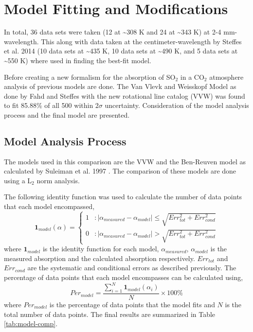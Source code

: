\chapter{Model Fitting and Modifications}
In total, 36 data sets were taken (12 at \textasciitilde 308 K and 24 at \textasciitilde 343 K) at 2-4 mm-wavelength. This along with data taken at the centimeter-wavelength by Steffes et al. 2014 \cite{Steffes-2014}(10 data sets at \textasciitilde 435 K, 10 data sets at \textasciitilde 490 K, and 5 data sets at \textasciitilde 550 K) where used in finding the best-fit model.

Before creating a new formalism for the absorption of SO$_2$ in a CO$_2$ atmosphere analysis of previous models are done. The Van Vlevk and Weisskopf Model as done by Fahd and Steffes \cite{Fahd-thesis} with the new rotational line catalog (VVW) was found to fit 85.88\% of all 500 within $2\sigma$ uncertainty. Consideration of the model analysis process and the final model are presented.


\section{Model Analysis Process}

The models used in this comparison are the VVW and the Ben-Reuven model as calculated by Suleiman et al. 1997 \cite{Suleiman-1996}. The comparison of these models are done using a L$_2$ norm analysis. 

The following identity function was used to calculate the number of data points that each model encompassed,
\begin{equation}
\textbf{1}_{model}(\alpha) = \left\{
     \begin{array}{lr}
       1 & : |\alpha_{measured} - \alpha_{model}| \leq \sqrt{Err_{tot}^2 + Err_{cond}^2 }\\
       0 & : |\alpha_{measured} - \alpha_{model}| > \sqrt{Err_{tot}^2 + Err_{cond}^2 }
     \end{array}
   \right.
\end{equation}
where $\textbf{1}_{model}$ is the identity function for each model, $\alpha_{measured}$, $\alpha_{model}$ is the measured absorption and the calculated absorption respectively. $Err_{tot}$ and $Err_{cond}$ are the systematic and conditional errors as described previously. The percentage of data points that each model encompasses can be calculated using,
\begin{equation}
Per_{model} = \frac{\sum_{i=1}^N \textbf{1}_{model}(\alpha_i)}{N}\times 100\%
\end{equation}
where $Per_{model}$ is the percentage of data points that the model fits and $N$ is the total number of data points. The final results are summarized in Table \ref{tab:model-comp}.

